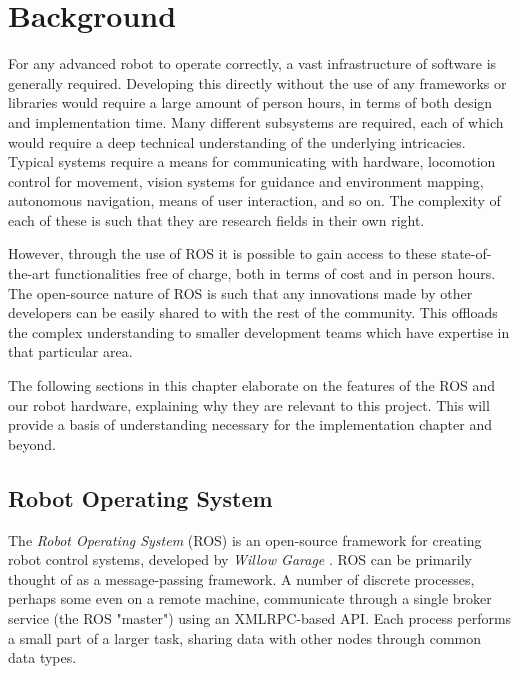 \chapter{Background}
\label{chap:background}

For any advanced robot to operate correctly, a vast infrastructure of software is generally required. Developing this directly without the use of any frameworks or libraries would require a large amount of person hours, in terms of both design and implementation time. Many different subsystems are required, each of which would require a deep technical understanding of the underlying intricacies. Typical systems require a means for communicating with hardware, locomotion control for movement, vision systems for guidance and environment mapping, autonomous navigation, means of user interaction, and so on. The complexity of each of these is such that they are research fields in their own right. 

However, through the use of ROS it is possible to gain access to these state-of-the-art functionalities free of charge, both in terms of cost and in person hours. The open-source nature of ROS is such that any innovations made by other developers can be easily shared to with the rest of the community. This offloads the complex understanding to smaller development teams which have expertise in that particular area.

The following sections in this chapter elaborate on the features of the ROS and our robot hardware, explaining why they are relevant to this project. This will provide a basis of understanding necessary for the implementation chapter and beyond.


\section{Robot Operating System}

The \emph{Robot Operating System} (ROS) is an open-source framework for creating robot control systems, developed by \emph{Willow Garage} \cite{ros_paper}. ROS can be primarily thought of as a message-passing framework. A number of discrete processes, perhaps some even on a remote machine, communicate through a single broker service (the ROS "master") using an XMLRPC-based API. Each process performs a small part of a larger task, sharing data with other nodes through common data types.

